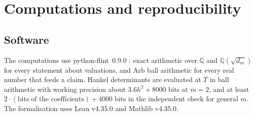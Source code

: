 \documentclass[11pt]{amsart}
\theoremstyle{definition}
\theoremstyle{remark}
\numberwithin{equation}{section}
\newcommand{\QQ}{\mathbb{Q}}
\begin{document}
\section{Computations and reproducibility}\label{sec:comp}

\subsection{Software}
The computations use python-flint~0.9.0 \cite{pythonflint}: exact arithmetic over $\QQ$ and $\QQ(\sqrt{d_m})$ for every
statement about valuations, and Arb ball arithmetic \cite{Arb} for every real number that feeds a claim. Hankel
determinants are evaluated at $T$ in ball arithmetic with working precision about $3.6h^2+8000$ bits at $m=2$, and at
least $2\cdot(\text{bits of the coefficients})+4000$ bits in the independent check for general $m$. The formalisation
uses Lean v4.35.0 and Mathlib v4.35.0.
\end{document}
